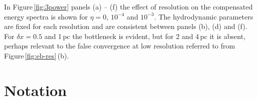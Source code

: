 \documentclass[preprint2]{aastex63}
\begin{document}
In Figure\,\ref{fig:3power} panels (a) -- (f) the effect of resolution on the
compensated energy spectra is shown for $\eta=0$, $10^{-4}$ and $10^{-3}$.
The hydrodynamic parameters are fixed for each resolution and are 
consistent between panels (b), (d) and (f).
For $\delta x=0.5$ and 1\,pc the bottleneck is evident, but for 2 and 4\,pc it
is absent, perhaps relevant to the false convergence at low resolution 
referred to from Figure\,\ref{fig:eb-res}\,(b).

{}


\appendix

\section{Notation}
\end{document}
